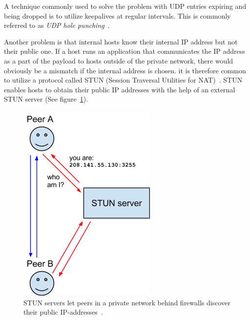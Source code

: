 A technique commonly used to solve the problem with UDP entries expiring and being dropped is to utilize keepalives at regular intervals. This is commonly referred to as \emph{UDP hole punching}~\cite{UDPHolePunching:Online}.

Another problem is that internal hosts know their internal IP address but not their public one. If a host runs an application that communicates the IP address as a part of the payload to hosts outside of the private network, there would obviously be a mismatch if the internal address is chosen. it is therefore common to utilize a protocol called STUN (Session Traversal Utilities for NAT)~\cite{RFC5389:Online}. STUN enables hosts to obtain their public IP addresses with the help of an external STUN server (See figure~\ref{fig:WebRTC - STUN}).

\begin{figure}[htp]
\centering
\includegraphics[width=\textwidth,height=0.2\paperheight,keepaspectratio
]{figures/webrtc-stun}
\caption{STUN servers let peers in a private network behind firewalls discover their public IP-addresses~\cite{WebRTCArchitecture:2014:Online}.}
\label{fig:WebRTC - STUN}
\end{figure}

